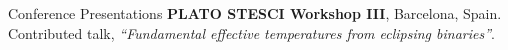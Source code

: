 \begin{rubric}{Conference Presentations}
\entry*[2019]%
	\textbf{PLATO STESCI Workshop III}, Barcelona, Spain. Contributed talk, \textit{``Fundamental effective temperatures from eclipsing binaries''}.  
%
%
%
\end{rubric}